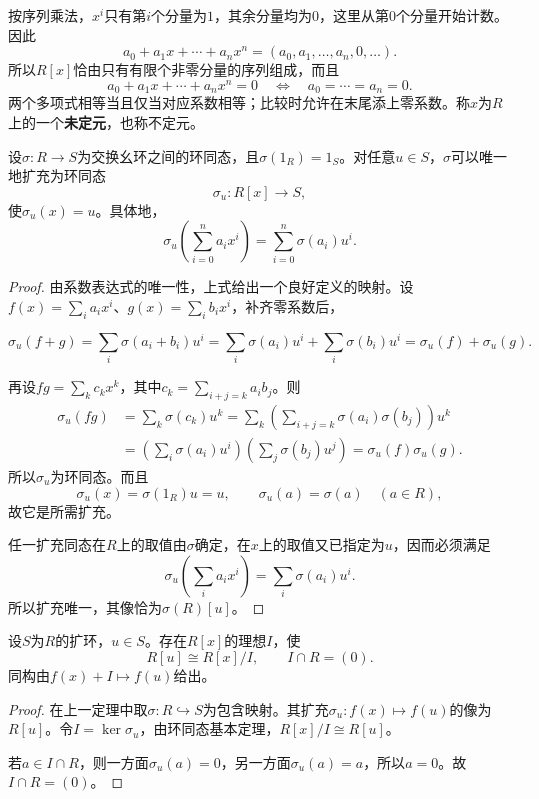 按序列乘法，$x^i$只有第$i$个分量为$1$，其余分量均为$0$，这里从第$0$个分量开始计数。因此
\[
a_0+a_1x+\cdots+a_nx^n=(a_0,a_1,\ldots,a_n,0,\ldots).
\]
所以$R[x]$恰由只有有限个非零分量的序列组成，而且
\[
a_0+a_1x+\cdots+a_nx^n=0
\quad\Longleftrightarrow\quad a_0=\cdots=a_n=0.
\]
两个多项式相等当且仅当对应系数相等；比较时允许在末尾添上零系数。称$x$为$R$上的一个\textbf{未定元}，也称不定元。

\begin{theorem}\label{p2:poly-universal}
设$\sigma:R\to S$为交换幺环之间的环同态，且$\sigma(1_R)=1_S$。对任意$u\in S$，$\sigma$可以唯一地扩充为环同态
\[
\sigma_u:R[x]\to S,
\]
使$\sigma_u(x)=u$。具体地，
\[
\sigma_u\left(\sum_{i=0}^n a_i x^i\right)
=\sum_{i=0}^n\sigma(a_i)u^i.
\]
\end{theorem}
\begin{proof}
由系数表达式的唯一性，上式给出一个良好定义的映射。设$f(x)=\sum_i a_i x^i$、$g(x)=\sum_i b_i x^i$，补齐零系数后，

\[ \sigma_u(f+g)
=\sum_i\sigma(a_i+b_i)u^i
=\sum_i\sigma(a_i)u^i+\sum_i\sigma(b_i)u^i
=\sigma_u(f)+\sigma_u(g). \]

再设$fg=\sum_k c_kx^k$，其中$c_k=\sum_{i+j=k}a_i b_j$。则
\begin{align*}
\sigma_u(fg)
&=\sum_k\sigma(c_k)u^k=\sum_k\left(\sum_{i+j=k}\sigma(a_i)\sigma(b_j)\right)u^k\\
&=\left(\sum_i\sigma(a_i)u^i\right)
  \left(\sum_j\sigma(b_j)u^j\right)=\sigma_u(f)\sigma_u(g).
\end{align*}
所以$\sigma_u$为环同态。而且
\[
\sigma_u(x)=\sigma(1_R)u=u,\qquad
\sigma_u(a)=\sigma(a)\quad(a\in R),
\]
故它是所需扩充。

任一扩充同态在$R$上的取值由$\sigma$确定，在$x$上的取值又已指定为$u$，因而必须满足
\[
\sigma_u\left(\sum_i a_i x^i\right)=\sum_i\sigma(a_i)u^i.
\]
所以扩充唯一，其像恰为$\sigma(R)[u]$。
\end{proof}

\begin{corollary}
设$S$为$R$的扩环，$u\in S$。存在$R[x]$的理想$I$，使
\[
R[u]\cong R[x]/I,\qquad I\cap R=(0).
\]
同构由$f(x)+I\mapsto f(u)$给出。
\end{corollary}
\begin{proof}
在上一定理中取$\sigma:R\hookrightarrow S$为包含映射。其扩充$\sigma_u:f(x)\mapsto f(u)$的像为$R[u]$。令$I=\ker\sigma_u$，由环同态基本定理，$R[x]/I\cong R[u]$。

若$a\in I\cap R$，则一方面$\sigma_u(a)=0$，另一方面$\sigma_u(a)=a$，所以$a=0$。故$I\cap R=(0)$。
\end{proof}


